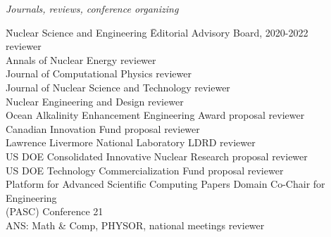 
\textit{Journals, reviews, conference organizing}
\begin{tabbing}
\hspace*{2 em}\= Nuclear Science and Engineering  \hspace*{8em} \= Editorial Advisory Board, 2020-2022\\
 \>  \> reviewer\\
%
\> Annals of Nuclear Energy \> reviewer\\
%
\> Journal of Computational Physics \> reviewer\\
%
\> Journal of Nuclear Science and Technology \> reviewer\\
%
\> Nuclear Engineering and Design \> reviewer\\
%
\>Ocean Alkalinity Enhancement Engineering Award\> proposal reviewer\\
%
\> Canadian Innovation Fund \> proposal reviewer\\
%
\> Lawrence Livermore  National Laboratory \> LDRD reviewer \\
%
\> US DOE Consolidated Innovative Nuclear Research \> proposal reviewer\\
%
\> US DOE Technology Commercialization Fund \> proposal reviewer\\
%
\> Platform for Advanced Scientific Computing  \> Papers Domain Co-Chair for Engineering\\
\>  \hspace*{2 em} (PASC) Conference 21\\
%
\> ANS: Math \& Comp, PHYSOR, national meetings \> reviewer
\end{tabbing}

